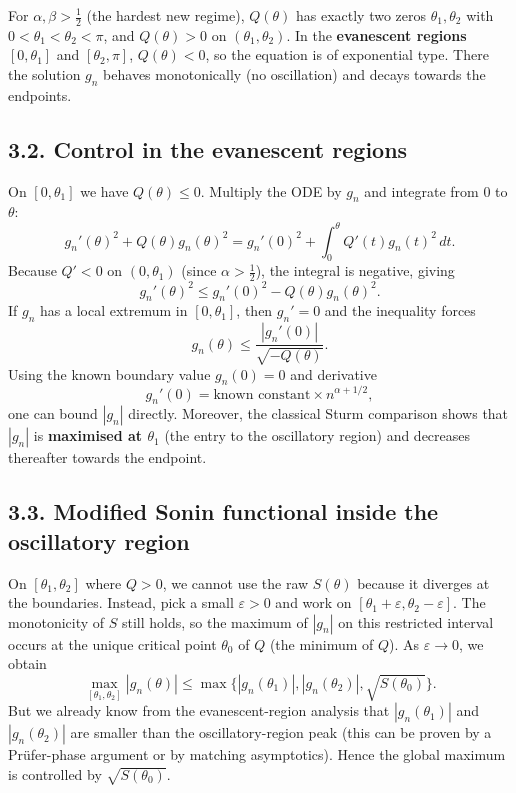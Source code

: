 \documentclass[11pt]{article}
\begin{document}
For \(\alpha,\beta>\frac12\) (the hardest new regime), \(Q(\theta)\) has exactly two zeros \(\theta_1,\theta_2\) with \(0<\theta_1<\theta_2<\pi\), and \(Q(\theta)>0\) on \((\theta_1,\theta_2)\). In the \textbf{evanescent regions} \([0,\theta_1]\) and \([\theta_2,\pi]\), \(Q(\theta)<0\), so the equation is of exponential type. There the solution \(g_n\) behaves monotonically (no oscillation) and decays towards the endpoints.

\subsection*{3.2. Control in the evanescent regions}

On \([0,\theta_1]\) we have \(Q(\theta)\le 0\). Multiply the ODE by \(g_n\) and integrate from \(0\) to \(\theta\):
\begin{equation*}
g_n'(\theta)^2+Q(\theta)g_n(\theta)^2
= g_n'(0)^2 + \int_0^\theta Q'(t)g_n(t)^2\,dt.
\end{equation*}
Because \(Q'<0\) on \((0,\theta_1)\) (since \(\alpha>\frac12\)), the integral is negative, giving
\begin{equation*}
g_n'(\theta)^2 \le g_n'(0)^2 - Q(\theta)g_n(\theta)^2.
\end{equation*}
If \(g_n\) has a local extremum in \([0,\theta_1]\), then \(g_n'=0\) and the inequality forces
\begin{equation*}
g_n(\theta)\le \frac{|g_n'(0)|}{\sqrt{-Q(\theta)}}.
\end{equation*}
Using the known boundary value \(g_n(0)=0\) and derivative
\begin{equation*}
g_n'(0) = \text{known constant}\times n^{\alpha+1/2},
\end{equation*}
one can bound \(|g_n|\) directly. Moreover, the classical Sturm comparison shows that \(|g_n|\) is \textbf{maximised at \(\theta_1\)} (the entry to the oscillatory region) and decreases thereafter towards the endpoint.

\subsection*{3.3. Modified Sonin functional inside the oscillatory region}

On \([\theta_1,\theta_2]\) where \(Q>0\), we cannot use the raw \(S(\theta)\) because it diverges at the boundaries. Instead, pick a small \(\varepsilon>0\) and work on \([\theta_1+\varepsilon,\theta_2-\varepsilon]\). The monotonicity of \(S\) still holds, so the maximum of \(|g_n|\) on this restricted interval occurs at the unique critical point \(\theta_0\) of \(Q\) (the minimum of \(Q\)). As \(\varepsilon\to0\), we obtain
\begin{equation*}
\max_{[\theta_1,\theta_2]}|g_n(\theta)|
\le \max\bigl\{ |g_n(\theta_1)|, |g_n(\theta_2)|, \sqrt{S(\theta_0)} \bigr\}.
\end{equation*}
But we already know from the evanescent-region analysis that \(|g_n(\theta_1)|\) and \(|g_n(\theta_2)|\) are smaller than the oscillatory-region peak (this can be proven by a Pr\"ufer-phase argument or by matching asymptotics). Hence the global maximum is controlled by \(\sqrt{S(\theta_0)}\).
\end{document}
